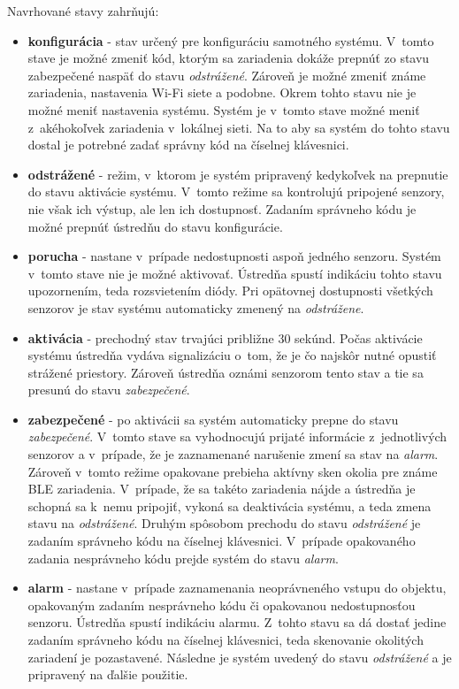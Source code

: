 \noindent Navrhované stavy zahrňujú:

\begin{itemize}
    \item \textbf{konfigurácia} - stav určený pre konfiguráciu samotného systému. V~tomto stave je možné zmeniť kód, ktorým sa zariadenia dokáže prepnúť zo stavu zabezpečené naspäť do stavu \textit{odstrážené}. Zároveň je možné zmeniť známe zariadenia, nastavenia Wi-Fi siete a podobne. Okrem tohto stavu nie je možné meniť nastavenia systému. Systém je v~tomto stave možné meniť z~akéhokoľvek zariadenia v~lokálnej sieti. Na to aby sa systém do tohto stavu dostal je potrebné zadať správny kód na číselnej klávesnici.
    \item \textbf{odstrážené} - režim, v~ktorom je systém pripravený kedykoľvek na prepnutie do stavu aktivácie systému. V~tomto režime sa kontrolujú pripojené senzory, nie však ich výstup, ale len ich dostupnosť. Zadaním správneho kódu je možné prepnúť ústredňu do stavu konfigurácie.
    \item \textbf{porucha} - nastane v~prípade nedostupnosti aspoň jedného senzoru. Systém v~tomto stave nie je možné aktivovať. Ústredňa spustí indikáciu tohto stavu upozornením, teda rozsvietením diódy. Pri opätovnej dostupnosti všetkých senzorov je stav systému automaticky zmenený na \textit{odstrážene}.
    \item \textbf{aktivácia} - prechodný stav trvajúci približne 30 sekúnd. Počas aktivácie systému ústredňa vydáva signalizáciu o~tom, že je čo najskôr nutné opustiť strážené priestory. Zároveň ústredňa oznámi senzorom tento stav a tie sa presunú do stavu \textit{zabezpečené}.
    \item \textbf{zabezpečené} - po aktivácii sa systém automaticky prepne do stavu \textit{zabezpečené}. V~tomto stave sa vyhodnocujú prijaté informácie z~jednotlivých senzorov a v~prípade, že je zaznamenané narušenie zmení sa stav na \textit{alarm}. Zároveň v~tomto režime opakovane prebieha aktívny sken okolia pre známe BLE zariadenia. V~prípade, že sa takéto zariadenia nájde a ústredňa je schopná sa k~nemu pripojiť, vykoná sa deaktivácia systému, a teda zmena stavu na \textit{odstrážené}. Druhým spôsobom prechodu do stavu \textit{odstrážené} je zadaním správneho kódu na číselnej klávesnici. V~prípade opakovaného zadania nesprávneho kódu prejde systém do stavu \textit{alarm}.
    \item \textbf{alarm} - nastane v~prípade zaznamenania neoprávneného vstupu do objektu, opakovaným zadaním nesprávneho kódu či opakovanou nedostupnosťou senzoru. Ústredňa spustí indikáciu alarmu. Z~tohto stavu sa dá dostať jedine zadaním správneho kódu na číselnej klávesnici, teda skenovanie okolitých zariadení je pozastavené. Následne je systém uvedený do stavu \textit{odstrážené} a je pripravený na ďalšie použitie.
\end{itemize}

